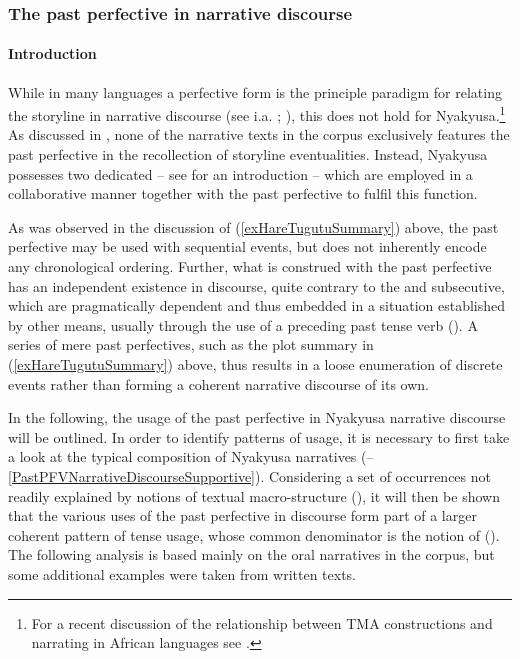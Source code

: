 \subsubsection{The past perfective in narrative discourse}
\label{PastPerfectiveNarrative}
\paragraph{Introduction}
While in many languages a perfective form is the principle paradigm for relating the storyline in narrative discourse (see i.a. \citealt{HopperP1979}; \citealt{FleischmanS1990}), this does not hold for Nyakyusa.\footnote{For a recent discussion of the relationship between TMA constructions and narrating in African languages see \citet{PayneDLShirtzS2015}.} As discussed in , none of the narrative texts in the corpus exclusively features the past perfective  in the recollection of storyline eventualities. Instead, Nyakyusa possesses two dedicated  -- see  for an introduction -- which are employed in a collaborative manner together with the past perfective to fulfil this function. 

As was observed in the discussion of (\ref{exHareTugutuSummary}) above, the past perfective may be used with sequential events, but does not inherently encode any chronological ordering. Further, what is construed with the past perfective has an independent existence in discourse, quite contrary to the  and subsecutive, which are pragmatically dependent and thus embedded in a situation established by other means, usually through the use of a preceding past tense verb (). A series of mere past perfectives, such as the plot summary in (\ref{exHareTugutuSummary}) above, thus results in a loose enumeration of discrete events rather than forming a coherent narrative discourse of its own.

 
In the following, the usage of the past perfective in Nyakyusa narrative discourse will be outlined. In order to identify patterns of usage, it is necessary to first take a look at the typical composition of Nyakyusa narratives (--\ref{PastPFVNarrativeDiscourseSupportive}). Considering a set of occurrences not readily explained by notions of textual macro-structure (), it will then be shown that the various uses of the past perfective in  discourse form part of a larger coherent pattern of tense usage, whose common denominator is the notion of  (). The following analysis is based mainly on the oral narratives in the corpus, but some additional examples were taken from written texts.

